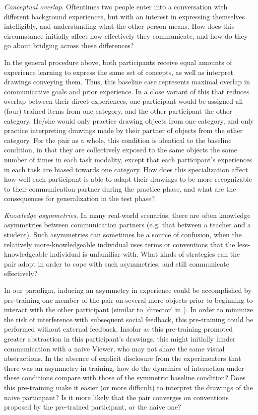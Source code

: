 \documentclass[12pt]{article}
\begin{document}
\emph{Conceptual overlap.} Oftentimes two people enter into a conversation with different background experiences, but with an interest in expressing themselves intelligibly, and understanding what the other person means. How does this circumstance initially affect how effectively they communicate, and how do they go about bridging across these differences? 

In the general procedure above, both participants receive equal amounts of experience learning to express the same set of concepts, as well as interpret drawings conveying them. Thus, this baseline case represents maximal overlap in communicative goals and prior experience. In a close variant of this that reduces overlap between their direct experiences, one participant would be assigned all (four) trained items from one category, and the other participant the other category. He/she would only practice drawing objects from one category, and only practice interpreting drawings made by their partner of objects from the other category. For the pair as a whole, this condition is identical to the baseline condition, in that they are collectively exposed to the same objects the same number of times in each task modality, except that each participant's experiences in each task are biased towards one category. How does this specialization affect how well each participant is able to adapt their drawings to be more recognizable to their communication partner during the practice phase, and what are the consequences for generalization in the test phase?
\medskip

\emph{Knowledge asymmetries.} In many real-world scenarios, there are often knowledge asymmetries between communication partners (e.g. that between a teacher and a student). Such asymmetries can sometimes be a source of confusion, when the relatively more-knowledgeable individual uses terms or conventions that the less-knowledgeable individual is unfamiliar with. What kinds of strategies can the pair adopt in order to cope with such asymmetries, and still communicate effectively? 

In our paradigm, inducing an asymmetry in experience could be accomplished by pre-training one member of the pair on several more objects prior to beginning to interact with the other participant (similar to `director' in ). In order to minimize the risk of interference with subsequent social feedback, this pre-training could be performed without external feedback. Insofar as this pre-training promoted greater abstraction in this participant's drawings, this might initially hinder communication with a naive Viewer, who may not share the same visual abstractions. In the absence of explicit disclosure from the experimenters that there was an asymmetry in training, how do the dynamics of interaction under these conditions compare with those of the symmetric baseline condition? Does this pre-training make it easier (or more difficult) to interpret the drawings of the naive participant? Is it more likely that the pair converges on conventions proposed by the pre-trained participant, or the naive one? 
\medskip
\end{document}
